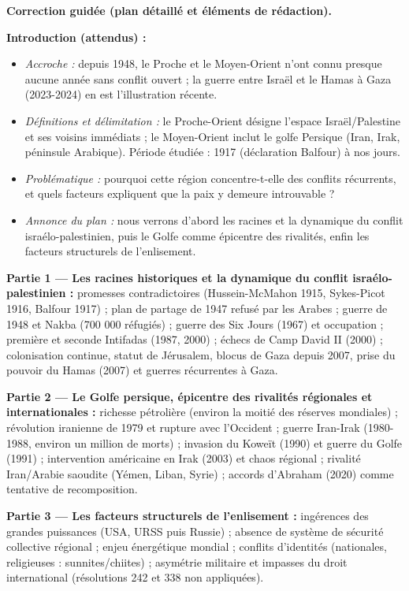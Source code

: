 \documentclass[11pt]{article}
\begin{document}
\begin{corrige}
\textbf{Correction guidée (plan détaillé et éléments de rédaction).}

\textbf{Introduction (attendus) :}
\begin{itemize}
    \item \emph{Accroche :} depuis 1948, le Proche et le Moyen-Orient n'ont connu presque aucune année sans conflit ouvert ; la guerre entre Israël et le Hamas à Gaza (2023-2024) en est l'illustration récente.
    \item \emph{Définitions et délimitation :} le Proche-Orient désigne l'espace Israël/Palestine et ses voisins immédiats ; le Moyen-Orient inclut le golfe Persique (Iran, Irak, péninsule Arabique). Période étudiée : 1917 (déclaration Balfour) à nos jours.
    \item \emph{Problématique :} pourquoi cette région concentre-t-elle des conflits récurrents, et quels facteurs expliquent que la paix y demeure introuvable ?
    \item \emph{Annonce du plan :} nous verrons d'abord les racines et la dynamique du conflit israélo-palestinien, puis le Golfe comme épicentre des rivalités, enfin les facteurs structurels de l'enlisement.
\end{itemize}

\textbf{Partie 1 — Les racines historiques et la dynamique du conflit israélo-palestinien :} promesses contradictoires (Hussein-McMahon 1915, Sykes-Picot 1916, Balfour 1917) ; plan de partage de 1947 refusé par les Arabes ; guerre de 1948 et Nakba (700 000 réfugiés) ; guerre des Six Jours (1967) et occupation ; première et seconde Intifadas (1987, 2000) ; échecs de Camp David II (2000) ; colonisation continue, statut de Jérusalem, blocus de Gaza depuis 2007, prise du pouvoir du Hamas (2007) et guerres récurrentes à Gaza.

\textbf{Partie 2 — Le Golfe persique, épicentre des rivalités régionales et internationales :} richesse pétrolière (environ la moitié des réserves mondiales) ; révolution iranienne de 1979 et rupture avec l'Occident ; guerre Iran-Irak (1980-1988, environ un million de morts) ; invasion du Koweït (1990) et guerre du Golfe (1991) ; intervention américaine en Irak (2003) et chaos régional ; rivalité Iran/Arabie saoudite (Yémen, Liban, Syrie) ; accords d'Abraham (2020) comme tentative de recomposition.

\textbf{Partie 3 — Les facteurs structurels de l'enlisement :} ingérences des grandes puissances (USA, URSS puis Russie) ; absence de système de sécurité collective régional ; enjeu énergétique mondial ; conflits d'identités (nationales, religieuses : sunnites/chiites) ; asymétrie militaire et impasses du droit international (résolutions 242 et 338 non appliquées).


\end{corrige}
\end{document}
